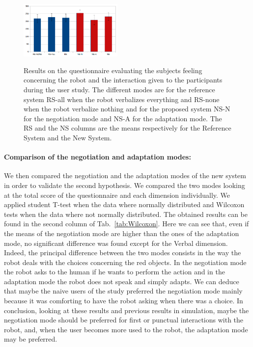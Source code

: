 \documentclass[english,a4paper,11pt,twoside]{StyleThese}
\begin{document}
\begin{figure}[!t]
{        \centering
        \includegraphics[width=0.45\textwidth]{figs/Chapter5/Verbal.png}
       \label{subfig:resVerbal}
   }\hfill
    \caption{Results on the questionnaire evaluating the subjects feeling concerning the robot and the interaction given to the participants during the user study. The different modes are for the reference system RS-all when the robot verbalizes everything and RS-none when the robot verbalize nothing and for the proposed system NS-N for the negotiation mode and NS-A for the adaptation mode. The RS and the NS columns are the means respectively for the Reference System and the New System.}
    \label{fig:resUS}
\end{figure}


\paragraph{Comparison of the negotiation and adaptation modes:} We then compared the negotiation and the adaptation modes of the new system in order to validate the second hypothesis. We compared the two modes looking at the total score of the questionnaire and each dimension individually. We applied student T-test when the data where normally distributed and Wilcoxon tests when the data where not normally distributed. The obtained results can be found in the second column of Tab.~\ref{tab:Wilcoxon}. Here we can see that, even if the means of the negotiation mode are higher than the ones of the adaptation mode, no significant difference was found except for the Verbal dimension. Indeed, the principal difference between the two modes consists in the way the robot deals with the choices concerning the red objects. In the negotiation mode the robot asks to the human if he wants to perform the action and in the adaptation mode the robot does not speak and simply adapts. We can deduce that maybe the naive users of the study preferred the negotiation mode mainly because it was comforting to have the robot asking when there was a choice. In conclusion, looking at these results and previous results in simulation, maybe the negotiation mode should be preferred for first or punctual interactions with the robot, and, when the user becomes more used to the robot, the adaptation mode may be preferred.
\end{document}
